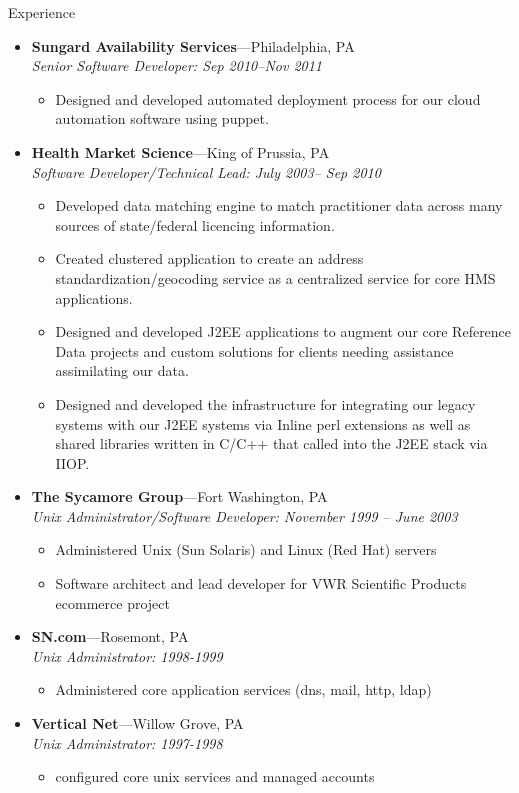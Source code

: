 \documentclass[11pt,oneside]{article}
\newenvironment{ressection}[1]{
        \vspace{4pt}
        {\fontfamily{phv}\selectfont\Large#1}
        \begin{itemize}
        \vspace{3pt}
}{
        \end{itemize}
}
\newcommand{\ressubitem}[1]{
        \vspace{-1pt}
        \item \begin{flushleft} #1 \end{flushleft}
}
\newcommand{\resbigitem}[3]{
        \vspace{-5pt}
        \item
        \textbf{#1}---#2 \\
        \textit{#3}
}
\newenvironment{ressubsec}[3]{
        \resbigitem{#1}{#2}{#3}
        \vspace{-2pt}
        \begin{itemize}
}{
        \end{itemize}
}
\begin{document}
\begin{ressection}{Experience}
        \begin{ressubsec}{Sungard Availability Services}{Philadelphia, PA}{Senior Software Developer: Sep 2010--Nov 2011}

          \ressubitem{Designed and developed automated deployment process for our cloud automation software using puppet. }
        \end{ressubsec}

        \begin{ressubsec}{Health Market Science}{King of Prussia, PA}{Software Developer/Technical Lead: July 2003-- Sep 2010}

          \ressubitem{Developed data matching engine to match practitioner data across many sources of state/federal licencing information.}

          \ressubitem{Created clustered application to create an
            address standardization/geocoding service as a centralized
            service for core HMS applications.}
          \ressubitem{Designed and developed J2EE applications to
            augment our core Reference Data projects and custom
            solutions for clients needing assistance assimilating our
            data.}

          \ressubitem{Designed and developed the infrastructure for
            integrating our legacy systems with our J2EE systems via
            Inline perl extensions as well as shared libraries written
            in C/C++ that called into the J2EE stack via IIOP.}

        \end{ressubsec}

        \begin{ressubsec}{The Sycamore Group}{Fort Washington, PA}{Unix Administrator/Software Developer: November 1999 -- June 2003}

          \ressubitem{Administered Unix (Sun Solaris) and Linux (Red Hat) servers}
          
          \ressubitem{Software architect and lead developer
            for VWR Scientific Products ecommerce project }


        \end{ressubsec}

        \begin{ressubsec}{SN.com}{Rosemont, PA}{Unix Administrator: 1998-1999}
          \ressubitem{Administered core application services (dns, mail, http, ldap)}
        \end{ressubsec}

        \begin{ressubsec}{Vertical Net}{Willow Grove, PA}{Unix Administrator: 1997-1998}
          \ressubitem{configured core unix services and managed accounts}
        \end{ressubsec}

\end{ressection}
\end{document}
